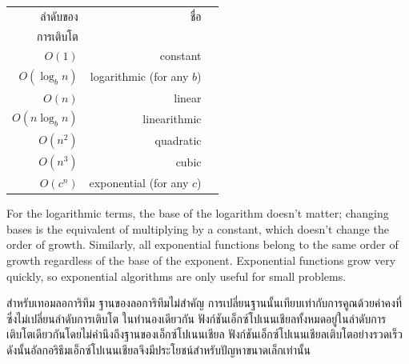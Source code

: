 
\begin{tabular}{|r|r|r|}
\hline
ลำดับของ     &   ชื่อ      \\
การเติบโต       &               \\
\hline
$O(1)$             & constant \\
$O(\log_b n)$      & logarithmic (for any $b$) \\
$O(n)$             & linear \\
$O(n \log_b n)$    & linearithmic \\
$O(n^2)$           & quadratic     \\
$O(n^3)$           & cubic     \\
$O(c^n)$           & exponential (for any $c$)    \\
\hline
\end{tabular}


For the logarithmic terms, the base of the logarithm doesn't matter;
changing bases is the equivalent of multiplying by a constant, which
doesn't change the order of growth.  Similarly, all exponential
functions belong to the same order of growth regardless of the base of
the exponent.
Exponential functions grow very quickly, so exponential algorithms are
only useful for small problems.

สำหรับเทอมลอการิทึม ฐานของลอการิทึมไม่สำคัญ การเปลี่ยนฐานนั้นเทียบเท่ากับการคูณด้วยค่าคงที่ซึ่งไม่เปลี่ยนลำดับการเติบโต 
ในทำนองเดียวกัน ฟังก์ชันเอ็กซ์โปเนนเชียลทั้งหมดอยู่ในลำดับการเติบโตเดียวกันโดยไม่คำนึงถึงฐานของเอ็กซ์โปเนนเชียล 
ฟังก์ชันเอ็กซ์โปเนนเชียลเติบโตอย่างรวดเร็ว ดังนั้นอัลกอริธึมเอ็กซ์โปเนนเชียลจึงมีประโยชน์สำหรับปัญหาขนาดเล็กเท่านั้น


